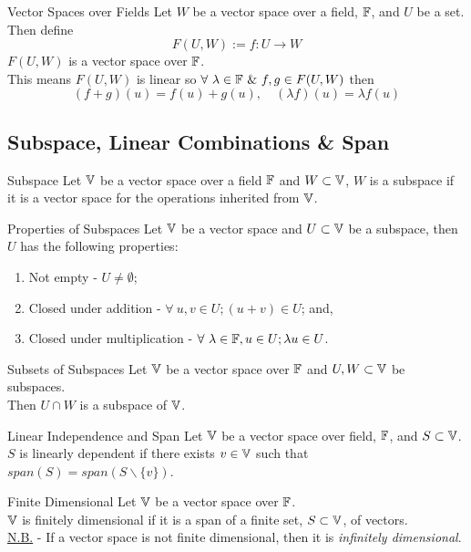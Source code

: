 \documentclass[11pt,a4paper]{article}
\begin{document}
\subtitle{Theorem 7.08 - }{Vector Spaces over Fields}
Let $W$ be a vector space over a field, $\mathbb{F}$, and $U$ be a set. Then define
$$F(U, W) := {f : U \to W}$$
$F(U, W)$ is a vector space over $\mathbb{F}$.\\
This means $F(U, W)$ is linear so $\forall\ \lambda \in \field\ \&\ f, g \in F(U, W)$ then
$$(f + g)(u) = f(u) + g(u),\quad (\lambda f)(u) = \lambda f(u)$$

\subsection{Subspace, Linear Combinations \& Span}

\subtitle{Definition 7.09 - }{Subspace}
Let $\mathbb{V}$ be a vector space over a field $\mathbb{F}$ and $W \subset \mathbb{V}$, $W$ is a subspace if it is a vector space for the operations inherited from $\mathbb{V}$.\\

\subtitle{Theorem 7.10 - }{Properties of Subspaces}
Let $\mathbb{V}$ be a vector space and $U \subset \mathbb{V}$ be a subspace, then $U$ has the following properties:
\begin{enumerate}[label=\roman*)]
  \item Not empty - $U \not = \emptyset$;
  \item Closed under addition - $\forall\ u, v \in U; (u + v) \in U$; and,
  \item Closed under multiplication - $\forall\ \lambda \in \field, u \in U; \lambda u \in U$.
\end{enumerate}

\subtitle{Theorem 7.11 - }{Subsets of Subspaces}
Let $\mathbb{V}$ be a vector space over $\mathbb{F}$ and $U, W \subset \mathbb{V}$ be subspaces.\\
Then $U \cap W$ is a subspace of $\mathbb{V}$.\\

\subtitle{Remark 7.12 - }{Linear Independence and Span}
Let $\mathbb{V}$ be a vector space over field, $\mathbb{F}$, and $S \subset \mathbb{V}$.\\
$S$ is linearly dependent if there exists $v \in \mathbb{V}$ such that $span(S) = span(S\backslash\{v\})$.\\

\subtitle{Definition 7.13 - }{Finite Dimensional}
Let $\mathbb{V}$ be a vector space over $\mathbb{F}$.\\
$\mathbb{V}$ is finitely dimensional if it is a span of a finite set, $S \subset \mathbb{V}$, of vectors.\\
\underline{N.B.} - If a vector space is not finite dimensional, then it is \textit{infinitely dimensional}.\\
\end{document}
